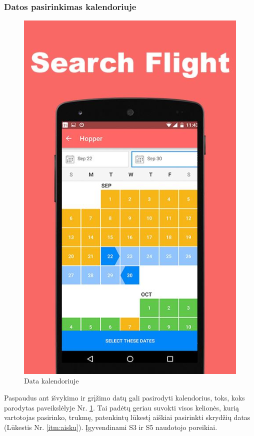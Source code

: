 \documentclass{VUMIFPSkursinis}
\begin{document}
\subsubsection{Datos pasirinkimas kalendoriuje}
\begin{figure}[H]
    \centering
    \includegraphics[scale=0.6]{img/hopper.jpg}
    \caption{Data kalendoriuje}
    \label{img:data1}
\end{figure}
Paspaudus ant išvykimo ir grįžimo datų gali pasirodyti kalendorius, toks, koks parodytas paveikslėlyje Nr. \ref{img:data1}. Tai padėtų geriau suvokti visos kelionės, kurią vartotojas pasirinko, trukmę, patenkintų lūkestį aiškiai pasirinkti skrydžių datas (Lūkestis Nr. \ref{itm:aisku}). Įgyvendinami S3 ir S5 naudotojo poreikiai.
\end{document}
